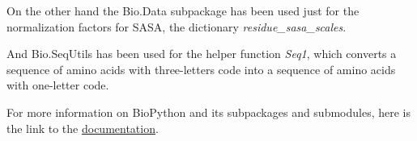 On the other hand the Bio.Data subpackage has been used just for the normalization factors for SASA, the dictionary \textit{residue\_sasa\_scales}. 

And Bio.SeqUtils has been used for the helper function \textit{Seq1}, which converts a sequence of amino acids with three-letters code into a sequence of amino acids with one-letter code.

For more information on BioPython and its subpackages and submodules, here is the link to the  \underline{\href{https://biopython.org/docs/dev/api/index.html}{documentation}}.